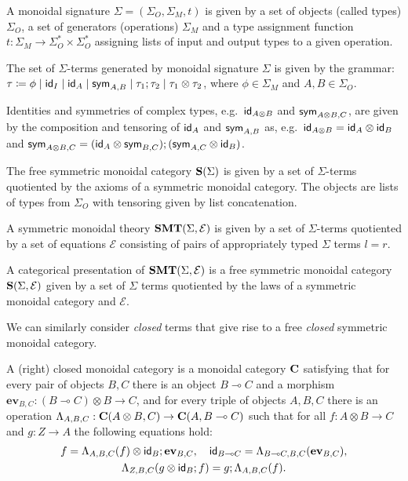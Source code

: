 \begin{defi}
	A monoidal signature $\Sigma = (\Sigma_{O}, \Sigma_{M}, t)$ is given by a set of objects (called types) $\Sigma_{O}$, a set of generators (operations) $\Sigma_{M}$ and a type assignment function $t\colon \Sigma_{M} \to \Sigma_{O}^{*} \times \Sigma_{O}^{*}$ assigning lists of input and output types to a given operation.
\end{defi}
\begin{defi}
	The set of $\Sigma$-terms generated by monoidal signature $\Sigma$ is given by the grammar:
	$\tau \coloneqq \phi \;|\; \textsf{id}_{I} \;|\; \textsf{id}_{A} \;|\; \textsf{sym}_{A,B} \;|\; \tau_{1};\tau_{2} \;|\; \tau_{1} \otimes \tau_{2}$,
	where $\phi \in \Sigma_{M}$ and $A,B \in \Sigma_{O}$.
\end{defi}
Identities and symmetries of complex types, e.g.\ $\textsf{id}_{A \otimes B}$ and $\textsf{sym}_{A \otimes B, C}$, are given by the composition and tensoring of $\textsf{id}_{A}$ and $\textsf{sym}_{A,B}$ as, e.g.\ $\textsf{id}_{A \otimes B} = \textsf{id}_{A} \otimes \textsf{id}_{B}$ and $\textsf{sym}_{A \otimes B, C} = (\textsf{id}_{A} \otimes \textsf{sym}_{B,C});(\textsf{sym}_{A,C} \otimes \textsf{id}_{B})$.
\begin{defi}
	The free symmetric monoidal category $\mathbf{S}(\Sigma)$ is given by a set of $\Sigma$-terms quotiented by the axioms of a symmetric monoidal category.
	The objects are lists of types from $\Sigma_{O}$ with tensoring given by list concatenation.
\end{defi}
\begin{defi}
	A symmetric monoidal theory $\mathbf{SMT}(\Sigma, \mathcal{E})$ is given by a set of $\Sigma$-terms quotiented by a set of equations $\mathcal{E}$ consisting of pairs of appropriately typed $\Sigma$ terms $l = r$.
\end{defi}
\begin{defi}
	A categorical presentation of  $\mathbf{SMT}(\Sigma, \mathcal{E})$ is a free symmetric monoidal category $\mathbf{S}(\Sigma, \mathcal{E})$ given by a set of $\Sigma$ terms quotiented by the laws of a symmetric monoidal category and $\mathcal{E}$.
\end{defi}

We can similarly consider \emph{closed} terms that give rise to a free \emph{closed} symmetric monoidal category.

\begin{defi}%
	\label{def:closed}
	A (right) closed monoidal category is a monoidal category $\mathbf{C}$ satisfying that for
	every pair of objects $B,C$ there is an object $B \multimap C$ and a morphism $\textbf{ev}_{B,C} : (B \multimap C) \otimes B \to
		C$, and for every triple of objects $A,B,C$ there is an operation $\Lambda_{A,B,C} : \mathbf{C}(A \otimes B,C) \to
		\mathbf{C}(A,B \multimap{} C)$ such that for all $f : A \otimes B \to C$ and $g : Z \to A$ the following equations hold:
	\begin{gather*}
		f = \Lambda_{A,B,C}(f) \otimes \textsf{id}_{B}; \textbf{ev}_{B,C},
		\quad
		\textsf{id}_{B \multimap{} C} = \Lambda_{B \multimap{} C,B,C}(\textbf{ev}_{B,C}),
		\\
		\Lambda_{Z,B,C}(g \otimes \textsf{id}_{B}; f) = g;\Lambda_{A,B,C}(f).
	\end{gather*}
\end{defi}

